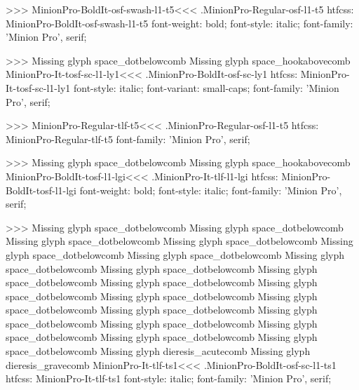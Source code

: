 {>>>
\<MinionPro-BoldIt-osf-swash-l1-t5\><<<
.MinionPro-Regular-osf-l1-t5
htfcss:  MinionPro-BoldIt-osf-swash-l1-t5  font-weight: bold; font-style: italic; font-family: 'Minion Pro', serif;

>>>
Missing glyph	space_dotbelowcomb
Missing glyph	space_hookabovecomb
\<MinionPro-It-tosf-sc-l1-ly1\><<<
.MinionPro-BoldIt-osf-sc-ly1
htfcss:  MinionPro-It-tosf-sc-l1-ly1  font-style: italic; font-variant: small-caps; font-family: 'Minion Pro', serif;

>>>
\<MinionPro-Regular-tlf-t5\><<<
.MinionPro-Regular-osf-l1-t5
htfcss:  MinionPro-Regular-tlf-t5  font-family: 'Minion Pro', serif;

>>>
Missing glyph	space_dotbelowcomb
Missing glyph	space_hookabovecomb
\<MinionPro-BoldIt-tosf-l1-lgi\><<<
.MinionPro-It-tlf-l1-lgi
htfcss:  MinionPro-BoldIt-tosf-l1-lgi  font-weight: bold; font-style: italic; font-family: 'Minion Pro', serif;

>>>
Missing glyph	space_dotbelowcomb
Missing glyph	space_dotbelowcomb
Missing glyph	space_dotbelowcomb
Missing glyph	space_dotbelowcomb
Missing glyph	space_dotbelowcomb
Missing glyph	space_dotbelowcomb
Missing glyph	space_dotbelowcomb
Missing glyph	space_dotbelowcomb
Missing glyph	space_dotbelowcomb
Missing glyph	space_dotbelowcomb
Missing glyph	space_dotbelowcomb
Missing glyph	space_dotbelowcomb
Missing glyph	space_dotbelowcomb
Missing glyph	space_dotbelowcomb
Missing glyph	space_dotbelowcomb
Missing glyph	space_dotbelowcomb
Missing glyph	space_dotbelowcomb
Missing glyph	space_dotbelowcomb
Missing glyph	space_dotbelowcomb
Missing glyph	dieresis_acutecomb
Missing glyph	dieresis_gravecomb
\<MinionPro-It-tlf-ts1\><<<
.MinionPro-BoldIt-osf-sc-l1-ts1
htfcss:  MinionPro-It-tlf-ts1  font-style: italic; font-family: 'Minion Pro', serif;

}
